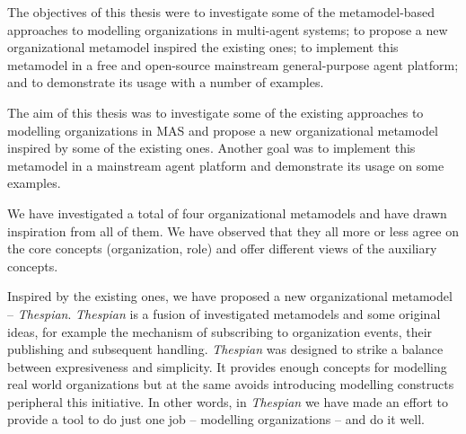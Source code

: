 


The objectives of this thesis were to investigate some of the metamodel-based approaches to modelling organizations in multi-agent systems; to propose a new organizational metamodel inspired the existing ones; to implement this metamodel in a free and open-source mainstream general-purpose agent platform; and to demonstrate its usage with a number of examples. 

The aim of this thesis was to investigate some of the existing approaches to modelling organizations in MAS and propose a new organizational metamodel inspired by some of the existing ones.
Another goal was to implement this metamodel in a mainstream agent platform and demonstrate its usage on some examples.

We have investigated a total of four organizational metamodels and have drawn inspiration from all of them.
We have observed that they all more or less agree on the core concepts (organization, role) and offer different views of the auxiliary concepts.

Inspired by the existing ones, we have proposed a new organizational metamodel -- \textit{Thespian}.
\textit{Thespian} is a fusion of investigated metamodels and some original ideas, for example the mechanism of subscribing to organization events, their publishing and subsequent handling.
\textit{Thespian} was designed to strike a balance between expresiveness and simplicity.
It provides enough concepts for modelling real world organizations but at the same avoids introducing modelling constructs peripheral this initiative.
In other words, in \textit{Thespian} we have made an effort to provide a tool to do just one job -- modelling organizations -- and do it well.

